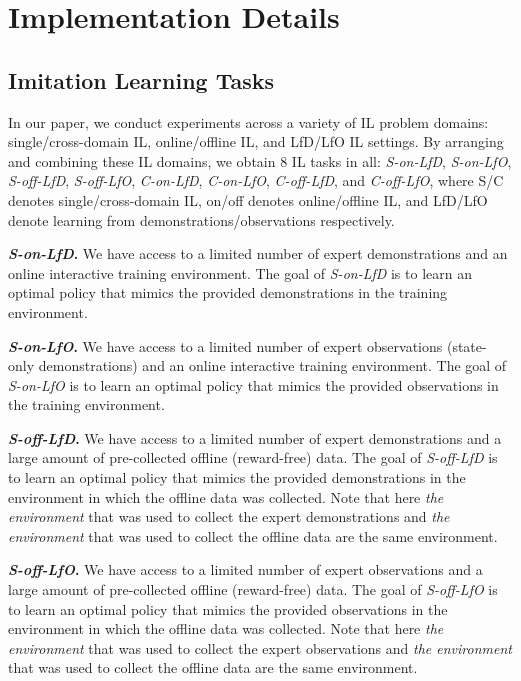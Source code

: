 \section{Implementation Details}


\subsection{Imitation Learning Tasks}

In our paper, we conduct experiments across a variety of IL problem domains: single/cross-domain IL, online/offline IL, and LfD/LfO IL settings. By arranging and combining these IL domains, we obtain 8 IL tasks in all: \textit{S-on-LfD}, \textit{S-on-LfO}, \textit{S-off-LfD}, \textit{S-off-LfO}, \textit{C-on-LfD}, \textit{C-on-LfO}, \textit{C-off-LfD}, and \textit{C-off-LfO}, where S/C denotes single/cross-domain IL, on/off denotes online/offline IL, and LfD/LfO denote learning from demonstrations/observations respectively. 

\textbf{\textit{S-on-LfD}.} 
We have access to a limited number of expert demonstrations and an online interactive training environment. 
The goal of \textit{S-on-LfD} is to learn an optimal policy that mimics the provided demonstrations in the training environment. 

\textbf{\textit{S-on-LfO}.} 
We have access to a limited number of expert observations (state-only demonstrations) and an online interactive training environment. 
The goal of \textit{S-on-LfO} is to learn an optimal policy that mimics the provided observations in the training environment. 


\textbf{\textit{S-off-LfD}.} 
We have access to a limited number of expert demonstrations and a large amount of pre-collected offline (reward-free) data. 
The goal of \textit{S-off-LfD} is to learn an optimal policy that mimics the provided demonstrations in the environment in which the offline data was collected. Note that here \textit{the environment} that was used to collect the expert demonstrations and \textit{the environment} that was used to collect the offline data are the same environment. 

\textbf{\textit{S-off-LfO}.} 
We have access to a limited number of expert observations and a large amount of pre-collected offline (reward-free) data. 
The goal of \textit{S-off-LfO} is to learn an optimal policy that mimics the provided observations in the environment in which the offline data was collected. Note that here \textit{the environment} that was used to collect the expert observations and \textit{the environment} that was used to collect the offline data are the same environment. 



